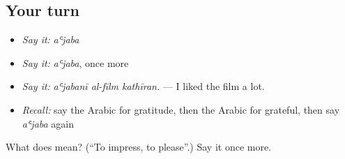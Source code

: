 \subsection*{Your turn}
\begin{itemize}
\raggedright
  \item \emph{Say it:} \emph{aʿjaba}
  \item \emph{Say it:} \emph{aʿjaba}, once more
  \item \emph{Say it:} \emph{aʿjabanī al-fīlm kathīran.} — I liked the film a lot.
  \item \emph{Recall:} say the Arabic for gratitude, then the Arabic for grateful, then say \emph{aʿjaba} again
\end{itemize}

\begin{tcolorbox}[breakable,colback=teal!4,colframe=teal!35!black,title={Before you move on}]
What does  mean? (\textquotedblleft{}To impress, to please\textquotedblright{}.) Say it once more.
\end{tcolorbox}
